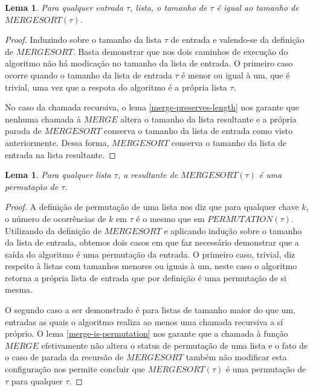 \documentclass[12pt]{article}
\newtheorem{lemma}[theorem]{Lema}
\theoremstyle{definition}
\begin{document}
\begin{lemma}
\label{mergesort-preserves-length}
        Para qualquer entrada $\tau$, lista, o tamanho de $\tau$ é igual ao tamanho de $MERGESORT(\tau)$.
\end{lemma}

\begin{proof}
        Induzindo sobre o tamanho da lista $\tau$ de entrada e valendo-se da definição de $MERGESORT$. Basta demonstrar
        que nos dois caminhos de execução do algoritmo não há modicação no tamanho da lista de entrada. O primeiro caso
        ocorre quando o tamanho da lista de entrada $\tau$ é menor ou igual à um, que é trivial, uma vez que a respota do algoritmo
        é a própria lista $\tau$.

        No caso da chamada recursiva, o lema \ref{merge-preserves-length} nos garante que nenhuma chamada à $MERGE$ 
        altera o tamanho da lista resultante e a própria parada de $MERGESORT$ conserva o tamanho da lista de entrada como visto
        anteriormente. Dessa forma, $MERGESORT$ conserva o tamanho da lista de entrada na lista resultante. 
\end{proof}

\begin{lemma}
\label{mergesort-is-permutation}
        Para qualquer lista $\tau$, a resultante de $MERGESORT(\tau)$ é uma permutação de $\tau$.
\end{lemma}

\begin{proof}
        A definição de permutação de uma lista nos diz que para qualquer chave $k$, o número de ocorrências
        de $k$ em $\tau$ é o mesmo que em $PERMUTATION(\tau)$. Utilizando da definição de $MERGESORT$ e aplicando
        indução sobre o tamanho da lista de entrada, obtemos dois casos em que faz necessário demonstrar que
        a saída do algoritmo é uma permutação da entrada. O primeiro caso, trivial, diz respeito à listas com tamanhos menores
        ou iguais à um, neste caso o algoritmo retorna a própria lista de entrada que por definição é uma permutação de si mesma.
        
        O segundo caso a ser demonstrado é para listas de tamanho maior do que um, entradas as quais o algoritmo realiza ao menos
        uma chamada recursiva a sí próprio. O lema \ref{merge-is-permutation} nos garante que a chamada à função $MERGE$
        efetivamente não altera o status de permutação de uma lista e o fato de o caso de parada da recursão de $MERGESORT$ também
        não modificar esta configuração nos permite concluir que $MERGESORT(\tau)$ é uma permutação de $\tau$ para qualquer $\tau$.
\end{proof}
\end{document}
